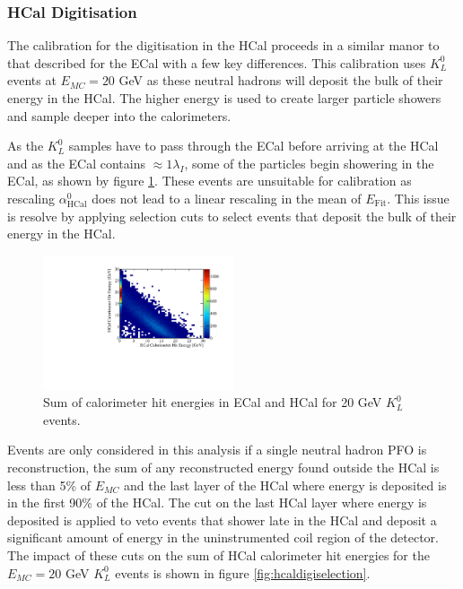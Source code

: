 
\subsubsection{HCal Digitisation}
\label{sec:hcaldigi}
The calibration for the digitisation in the HCal proceeds in a similar manor to that described for the ECal with a few key differences.  This calibration uses $K^{0}_{L}$ events at $E_{MC} = 20$ GeV as these neutral hadrons will deposit the bulk of their energy in the HCal.  The higher energy is used to create larger particle showers and sample deeper into the calorimeters.  

As the $K^{0}_{L}$ samples have to pass through the ECal before arriving at the HCal and as the ECal contains $\approx 1 \lambda_{I}$, some of the particles begin showering in the ECal, as shown by figure \ref{fig:hcaldigikaonsplit}.  These events are unsuitable for calibration as rescaling $\alpha^{0}_{\text{HCal}}$ does not lead to a linear rescaling in the mean of $E_{\text{Fit}}$.  This issue is resolve by applying selection cuts to select events that deposit the bulk of their energy in the HCal.  

\begin{figure}
\includegraphics[width=0.5\textwidth]{EnergyEstimators/Plots/Calibration/Digitsation/HCal/ECalHCalKaon0LSplit.pdf}
\caption[Sum of calorimeter hit energies in ECal and HCal for 20 GeV $K^{0}_{L}$ events.]{Sum of calorimeter hit energies in ECal and HCal for 20 GeV $K^{0}_{L}$ events.}
\label{fig:hcaldigikaonsplit}
\end{figure}

Events are only considered in this analysis if a single neutral hadron PFO is reconstruction, the sum of any reconstructed energy found outside the HCal is less than 5\% of $E_{MC}$ and the last layer of the HCal where energy is deposited is in the first 90\% of the HCal.  The cut on the last HCal layer where energy is deposited is applied to veto events that shower late in the HCal and deposit a significant amount of energy in the uninstrumented coil region of the detector.  The impact of these cuts on the sum of HCal calorimeter hit energies for the $E_{MC} = 20$ GeV $K^{0}_{L}$ events is shown in figure \ref{fig:hcaldigiselection}.

